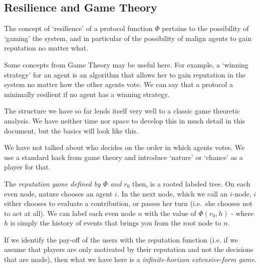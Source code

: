 \documentclass{article}
\newcommand{\flow}{\Phi}
\begin{document}
\subsection{Resilience and Game Theory}

The concept of `resilience' of a protocol function $\flow$ pertains to the possibility of `gaming' the system, and in particular of the possibility of malign agents to gain reputation no matter what. 

Some concepts from Game Theory may be useful here. For example, a `winning strategy' for an agent is an algorithm that allows her to gain reputation in the system no matter how the other agents vote. We can say that a protocol a minimally resilient if no agent has a winning strategy.



The structure we have so far lends itself very well to a classic game theoretic analysis. We have neither time nor space to develop this in much detail in this document, but the basics will look like this.


We have not talked about who decides on the order in which agents votes. We use a standard hack from game theory and introduce `nature' or `chance' as a player for that.

The {\em reputation game defined by $\flow$ and $r_0$} then, is a rooted labeled tree. On each even node, nature chooses an agent $i$. In the next node, which we call an $i$-node, $i$ either chooses to evaluate a contribution, or passes her turn (i.e.\ she chooses not to act at all). 
We can label each even node $n$ with the value of $\flow(r_0, h)$ - where $h$ is simply the history of events that brings you from the root node to $n$.

If we identify the pay-off of the users with the reputation function (i.e. if we assume that players are only motivated by their reputation and not the decisions that are made), then what we have here is a {\em infinite-horizon extensive-form game}.
\end{document}
